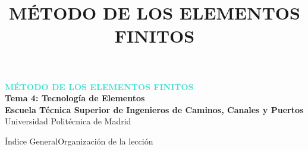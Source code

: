 \documentclass[10pt, aspectratio=43]{beamer}
\title[Tecnología de Elementos]{MÉTODO DE LOS ELEMENTOS FINITOS}
\institute{Universidad Politécnica de Madrid}
\date{}
\begin{document}
\begin{frame}
  \vfill
  \begin{uicard}[borderline north={4.5pt}{0pt}{DarkSlate}, left=16pt, right=16pt, top=22pt, bottom=22pt]
    \centering
    \vspace{0.2cm}
    {\large\bfseries \textcolor{Turquoise}{MÉTODO DE LOS ELEMENTOS FINITOS}}\\[0.7cm]
    
    {\Large \textcolor{DarkSlate}{\textbf{Tema 4: Tecnología de Elementos}}}\\[1.1cm]
    
    {\small \textcolor{TextDark!85}{\textbf{Escuela Técnica Superior de Ingenieros de Caminos, Canales y Puertos}}}\\[0.15cm]
    \textcolor{TextDark!65}{\footnotesize Universidad Politécnica de Madrid}
    \vspace{0.2cm}
  \end{uicard}
  \vfill
\end{frame}

\begin{frame}{Índice General}{Organización de la lección}
  \tableofcontents
\end{frame}

\end{document}
